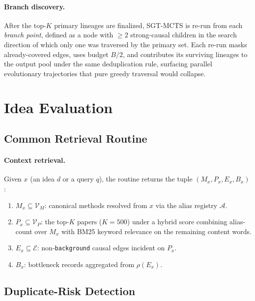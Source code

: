 \documentclass{opendatalab}
\begin{document}
\paragraph{Branch discovery.}
After the top-$K$ primary lineages are finalized, SGT-MCTS is re-run from each \emph{branch point}, defined as a
node with $\ge 2$ strong-causal children in the search direction of which only one was traversed by the primary
set. Each re-run masks already-covered edges, uses budget $B/2$, and contributes its surviving lineages to the
output pool under the same deduplication rule, surfacing parallel evolutionary trajectories that pure greedy
traversal would collapse.


\section{Idea Evaluation}
\label{app:eval}

\subsection{Common Retrieval Routine}
\label{app:retrieval}

\paragraph{Context retrieval.}
Given $x$ (an idea $d$ or a query $q$), the routine returns the tuple $(M_x, P_x, E_x, B_x)$:
\begin{enumerate}
\item $M_x \subseteq \mathcal{V}_M$: canonical methods resolved from $x$ via the alias registry $\mathcal{A}$.
\item $P_x \subseteq \mathcal{V}_P$: the top-$K$ papers ($K=500$) under a hybrid score combining alias-count over
$M_x$ with BM25 keyword relevance on the remaining content words.
\item $E_x \subseteq \mathcal{E}$: non-\texttt{background} causal edges incident on $P_x$.
\item $B_x$: bottleneck records aggregated from $\rho(E_x)$.
\end{enumerate}

\subsection{Duplicate-Risk Detection}
\end{document}
